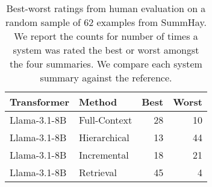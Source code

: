 \begin{table}[t]
    \centering
    \begin{tabular}{@{}llrr@{}}
    \toprule
    Transformer & Method & Best & Worst \\
    \midrule
    Llama-3.1-8B & Full-Context & 28 & 10 \\
    Llama-3.1-8B & Hierarchical & 13 & 44 \\
    Llama-3.1-8B & Incremental & 18 & 21 \\
    Llama-3.1-8B & Retrieval & 45 & 4 \\
    \bottomrule
    \end{tabular}
    \caption{Best-worst ratings from human evaluation on a random sample of 62 examples from SummHay. We report the counts for number of times a system was rated the best or worst amongst the four summaries. We compare each system summary against the reference.}
    \label{tab:human_eval}
\end{table}